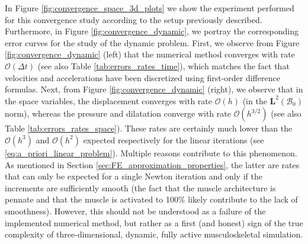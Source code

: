 \documentclass{sfuthesis}
\numberwithin{equation}{section}
\numberwithin{figure}{chapter}
\numberwithin{table}{chapter}
\theoremstyle{definition}
\def\*#1{{\mathbf{#1}}} %
\newcommand{\B}{\mathcal{B}}
\begin{document}
In Figure \ref{fig:convergence_space_3d_plots} we show the experiment performed for this convergence study according to the setup previously described. Furthermore, in Figure \ref{fig:convergence_dynamic}, we portray the corresponding error curves for the study of the dynamic problem. First, we observe from Figure \ref{fig:convergence_dynamic} (left) that the numerical method converges with rate $\mathcal{O}(\Delta t)$ (see also Table \ref{tab:errors_rates_time}), which matches the fact that velocities and accelerations have been discretized using first-order difference formulas. Next, from Figure \ref{fig:convergence_dynamic} (right), we observe that in the space variables, the displacement converges with rate $\mathcal{O}(h)$ (in the $\*L^2(\B_0)$ norm), whereas the pressure and dilatation converge with rate $\mathcal{O}(h^{3/2})$ (see also Table \ref{tab:errors_rates_space}). These rates are certainly much lower than the $\mathcal{O}(h^3)$ and $\mathcal{O}(h^2)$ expected respectively for the linear iterations (see \eqref{eq:a_priori_linear_problem}). Multiple reasons contribute to this phenomenon. As mentioned in Section \ref{sec:FE_approximation_properties}, the latter are rates that can only be expected for a single Newton iteration and only if the increments are sufficiently smooth (the fact that the muscle architecture is pennate and that the muscle is activated to 100\% likely contribute to the lack of smoothness). However, this should not be understood as a failure of the implemented numerical method, but rather as a first (and honest) sign of the true complexity of three-dimensional, dynamic, fully active musculoskeletal simulation. 
\end{document}
